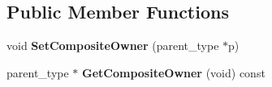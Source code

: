 \subsection*{Public Member Functions}
\begin{DoxyCompactItemize}
\item 
\hypertarget{class_rak_net_1_1_replica3_composite_a08852e371dc44c5f4cc01eea5b679719}{void {\bfseries Set\-Composite\-Owner} (parent\-\_\-type $\ast$p)}\label{class_rak_net_1_1_replica3_composite_a08852e371dc44c5f4cc01eea5b679719}

\item 
\hypertarget{class_rak_net_1_1_replica3_composite_a9166de84b9d0326a9dbc06ce02d222de}{parent\-\_\-type $\ast$ {\bfseries Get\-Composite\-Owner} (void) const }\label{class_rak_net_1_1_replica3_composite_a9166de84b9d0326a9dbc06ce02d222de}


\end{DoxyCompactItemize}
